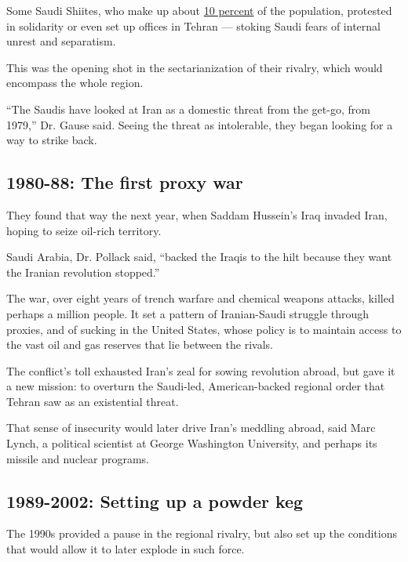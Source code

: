 Some Saudi Shiites, who make up about
\href{http://www.nytimes.com/2014/03/15/world/middleeast/saudis-lonely-costly-bid-for-sunni-shiite-equality.html}{10
percent} of the population, protested in solidarity or even set up
offices in Tehran --- stoking Saudi fears of internal unrest and
separatism.

This was the opening shot in the sectarianization of their rivalry,
which would encompass the whole region.

``The Saudis have looked at Iran as a domestic threat from the get-go,
from 1979,'' Dr. Gause said. Seeing the threat as intolerable, they
began looking for a way to strike back.

\hypertarget{1980-88-the-first-proxy-war}{%
\subsection{1980-88: The first proxy
war}\label{1980-88-the-first-proxy-war}}

They found that way the next year, when Saddam Hussein's Iraq invaded
Iran, hoping to seize oil-rich territory.

Saudi Arabia, Dr. Pollack said, ``backed the Iraqis to the hilt because
they want the Iranian revolution stopped.''

The war, over eight years of trench warfare and chemical weapons
attacks, killed perhaps a million people. It set a pattern of
Iranian-Saudi struggle through proxies, and of sucking in the United
States, whose policy is to maintain access to the vast oil and gas
reserves that lie between the rivals.

The conflict's toll exhausted Iran's zeal for sowing revolution abroad,
but gave it a new mission: to overturn the Saudi-led, American-backed
regional order that Tehran saw as an existential threat.

That sense of insecurity would later drive Iran's meddling abroad, said
Marc Lynch, a political scientist at George Washington University, and
perhaps its missile and nuclear programs.

\hypertarget{1989-2002-setting-up-a-powder-keg}{%
\subsection{1989-2002: Setting up a powder
keg}\label{1989-2002-setting-up-a-powder-keg}}

The 1990s provided a pause in the regional rivalry, but also set up the
conditions that would allow it to later explode in such force.

